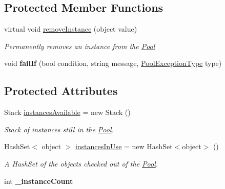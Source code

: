\subsection*{Protected Member Functions}
\begin{DoxyCompactItemize}
\item 
virtual void \hyperlink{classstrange_1_1extensions_1_1pool_1_1impl_1_1_pool_ac687dc8474a5e46b1cff3819aea2672d}{remove\-Instance} (object value)
\begin{DoxyCompactList}\small\item\em Permanently removes an instance from the \hyperlink{classstrange_1_1extensions_1_1pool_1_1impl_1_1_pool}{Pool} \end{DoxyCompactList}\item 
\hypertarget{classstrange_1_1extensions_1_1pool_1_1impl_1_1_pool_a35f11933a6148a85562e16fe564d8281}{void {\bfseries fail\-If} (bool condition, string message, \hyperlink{namespacestrange_1_1extensions_1_1pool_1_1api_a93ccdd4d6e731ba8a31a774428edec32}{Pool\-Exception\-Type} type)}\label{classstrange_1_1extensions_1_1pool_1_1impl_1_1_pool_a35f11933a6148a85562e16fe564d8281}

\end{DoxyCompactItemize}
\subsection*{Protected Attributes}
\begin{DoxyCompactItemize}
\item 
\hypertarget{classstrange_1_1extensions_1_1pool_1_1impl_1_1_pool_ad7b384df284bdd25b3ee158ec8e4b110}{Stack \hyperlink{classstrange_1_1extensions_1_1pool_1_1impl_1_1_pool_ad7b384df284bdd25b3ee158ec8e4b110}{instances\-Available} = new Stack ()}\label{classstrange_1_1extensions_1_1pool_1_1impl_1_1_pool_ad7b384df284bdd25b3ee158ec8e4b110}

\begin{DoxyCompactList}\small\item\em Stack of instances still in the \hyperlink{classstrange_1_1extensions_1_1pool_1_1impl_1_1_pool}{Pool}. \end{DoxyCompactList}\item 
\hypertarget{classstrange_1_1extensions_1_1pool_1_1impl_1_1_pool_a05948789a396a039296ad34b7c40b164}{Hash\-Set$<$ object $>$ \hyperlink{classstrange_1_1extensions_1_1pool_1_1impl_1_1_pool_a05948789a396a039296ad34b7c40b164}{instances\-In\-Use} = new Hash\-Set$<$object$>$ ()}\label{classstrange_1_1extensions_1_1pool_1_1impl_1_1_pool_a05948789a396a039296ad34b7c40b164}

\begin{DoxyCompactList}\small\item\em A Hash\-Set of the objects checked out of the \hyperlink{classstrange_1_1extensions_1_1pool_1_1impl_1_1_pool}{Pool}. \end{DoxyCompactList}\item 
\hypertarget{classstrange_1_1extensions_1_1pool_1_1impl_1_1_pool_adb85eb9451c096c5e89e0f067c9a0a04}{int {\bfseries \-\_\-instance\-Count}}\label{classstrange_1_1extensions_1_1pool_1_1impl_1_1_pool_adb85eb9451c096c5e89e0f067c9a0a04}

\end{DoxyCompactItemize}
